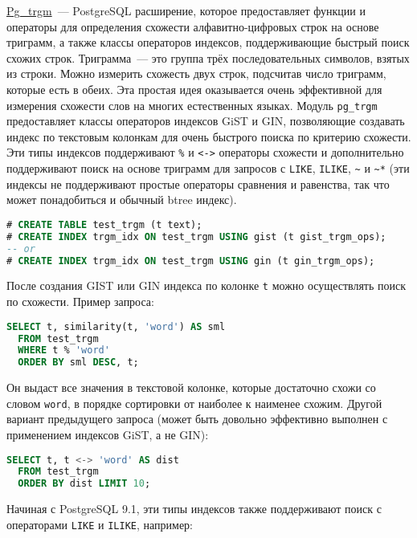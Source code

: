 \href{https://www.postgresql.org/docs/current/static/pgtrgm.html}{Pg\_trgm}~--- PostgreSQL расширение, которое предоставляет функции и операторы для определения схожести алфавитно-цифровых строк на основе триграмм, а также классы операторов индексов, поддерживающие быстрый поиск схожих строк. Триграмма~--- это группа трёх последовательных символов, взятых из строки. Можно измерить схожесть двух строк, подсчитав число триграмм, которые есть в обеих. Эта простая идея оказывается очень эффективной для измерения схожести слов на многих естественных языках. Модуль \lstinline!pg_trgm! предоставляет классы операторов индексов GiST и GIN, позволяющие создавать индекс по текстовым колонкам для очень быстрого поиска по критерию схожести. Эти типы индексов поддерживают \lstinline!%! и \lstinline!<->! операторы схожести и дополнительно поддерживают поиск на основе триграмм для запросов с \lstinline!LIKE!, \lstinline!ILIKE!, \lstinline!~! и \lstinline!~*! (эти индексы не поддерживают простые операторы сравнения и равенства, так что может понадобиться и обычный btree индекс).

\begin{lstlisting}[language=SQL,label=lst:pgtrgm2,caption=pg\_trgm]
# CREATE TABLE test_trgm (t text);
# CREATE INDEX trgm_idx ON test_trgm USING gist (t gist_trgm_ops);
-- or
# CREATE INDEX trgm_idx ON test_trgm USING gin (t gin_trgm_ops);
\end{lstlisting}

После создания GIST или GIN индекса по колонке \lstinline!t! можно осуществлять поиск по схожести. Пример запроса:

\begin{lstlisting}[language=SQL,label=lst:pgtrgm3,caption=pg\_trgm]
SELECT t, similarity(t, 'word') AS sml
  FROM test_trgm
  WHERE t % 'word'
  ORDER BY sml DESC, t;
\end{lstlisting}

Он выдаст все значения в текстовой колонке, которые достаточно схожи со словом \lstinline!word!, в порядке сортировки от наиболее к наименее схожим. Другой вариант предыдущего запроса (может быть довольно эффективно выполнен с применением индексов GiST, а не GIN):

\begin{lstlisting}[language=SQL,label=lst:pgtrgm4,caption=pg\_trgm]
SELECT t, t <-> 'word' AS dist
  FROM test_trgm
  ORDER BY dist LIMIT 10;
\end{lstlisting}

Начиная с PostgreSQL 9.1, эти типы индексов также поддерживают поиск с операторами \lstinline!LIKE! и \lstinline!ILIKE!, например:

